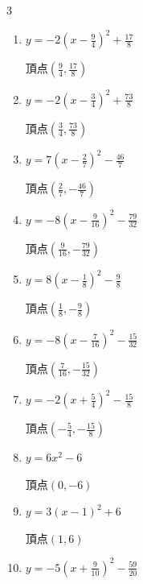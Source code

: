 \begin{multicols}{3}
\begin{enumerate}
        $\displaystyle 頂点\left( -1 , 3 \right)$

  \item $\displaystyle y=-2\left( x-\frac{9}{4}\right)^{2}+\frac{17}{8}$

        $\displaystyle 頂点\left( \frac{9}{4} , \frac{17}{8} \right)$

  \item $\displaystyle y=-2\left( x-\frac{3}{4}\right)^{2}+\frac{73}{8}$

        $\displaystyle 頂点\left( \frac{3}{4} , \frac{73}{8} \right)$

  \item $\displaystyle y=7\left( x-\frac{2}{7}\right)^{2}-\frac{46}{7}$

        $\displaystyle 頂点\left( \frac{2}{7} , -\frac{46}{7} \right)$

  \item $\displaystyle y=-8\left( x-\frac{9}{16}\right)^{2}-\frac{79}{32}$

        $\displaystyle 頂点\left( \frac{9}{16} , -\frac{79}{32} \right)$

  \item $\displaystyle y=8\left( x-\frac{1}{8}\right)^{2}-\frac{9}{8}$

        $\displaystyle 頂点\left( \frac{1}{8} , -\frac{9}{8} \right)$

  \item $\displaystyle y=-8\left( x-\frac{7}{16}\right)^{2}-\frac{15}{32}$

        $\displaystyle 頂点\left( \frac{7}{16} , -\frac{15}{32} \right)$

\columnbreak %

  \item $\displaystyle y=-2\left( x+\frac{5}{4}\right)^{2}-\frac{15}{8}$

        $\displaystyle 頂点\left( -\frac{5}{4} , -\frac{15}{8} \right)$

  \item $\displaystyle y=6x^{2}-6$

        $\displaystyle 頂点\left( 0 , -6 \right)$

  \item $\displaystyle y=3\left( x-1\right)^{2}+6$

        $\displaystyle 頂点\left( 1 , 6 \right)$

  \item $\displaystyle y=-5\left( x+\frac{9}{10}\right)^{2}-\frac{59}{20}$


\end{enumerate}
\end{multicols}
